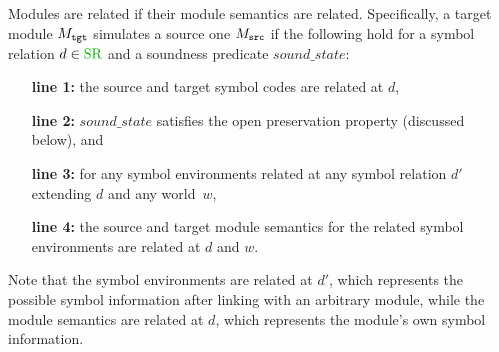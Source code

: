 Modules are related if their module semantics are related. Specifically,
a target module $M_{\texttt{tgt}}$ simulates a source one $M_{\texttt{src}}$
if the following hold for a symbol relation $d \in \SREL$ and a soundness predicate $sound\_state$:
\begin{itemize}[leftmargin=11mm]
\item[\textbf{line 1:}] the source and target symbol codes are related at $d$,
\item[\textbf{line 2:}] $sound\_state$ satisfies the open preservation property (discussed below), and
\item[\textbf{line 3:}] for any symbol environments related at any symbol relation $d'$ extending $d$ and any world~$w$,
\item[\textbf{line 4:}] the source and target module semantics for the related symbol environments are related at $d$ and $w$.
\end{itemize}
Note that the symbol environments are related at $d'$, which represents the possible symbol information after linking with an arbitrary module,
while the module semantics are related at $d$, which represents the module's own symbol information.


